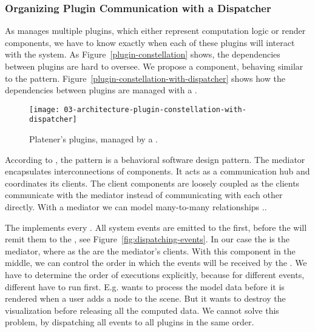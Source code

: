 \documentclass[../03-Architecture.tex]{subfiles}
\begin{document}
\subsubsection{Organizing Plugin Communication with a
  Dispatcher}


As {\convertify} manages multiple plugins, which either represent
computation logic or render components, we have to know exactly when
each of these plugins will interact with the system. As
Figure~\ref{plugin-constellation} shows, the dependencies between
plugins are hard to oversee. We propose a 
component, behaving similar to the  pattern.
Figure~\ref{plugin-constellation-with-dispatcher} shows how the
dependencies between plugins are managed with a .

\begin{figure}[h]
  \centering
  \texttt{[image: 03-architecture-plugin-constellation-with-dispatcher]}
  \caption{Platener's plugins, managed by a .}
  \label{fig:plugin-constellation-with-dispatcher}
\end{figure}

According to \citeauthor{gof}, the  pattern is a
behavioral software design pattern. The mediator encapsulates
interconnections of components. It acts as a communication hub and
coordinates its clients. The client components are loosely coupled as
the clients communicate with the mediator instead of communicating
with each other directly. With a mediator we can model many-to-many
relationships \cite[p. ?]{gof}..


The  implements every . All system
events are emitted to the  first, before the
 will remit them to the , see
Figure~\ref{fig:dispatching-events}. In our case the
 is the mediator, where as the  are
the mediator's clients. With this component in the middle, we can
control the order in which the events will be received by the
. We have to determine the order of 
executions explicitly, because for different events, different
 have to run first. E.g. {\platener} wants to process
the model data before it is rendered when a user adds a node to the
scene. But it wants to destroy the visualization before releasing all
the computed data. We cannot solve this problem, by dispatching all
events to all plugins in the same order.
\end{document}

